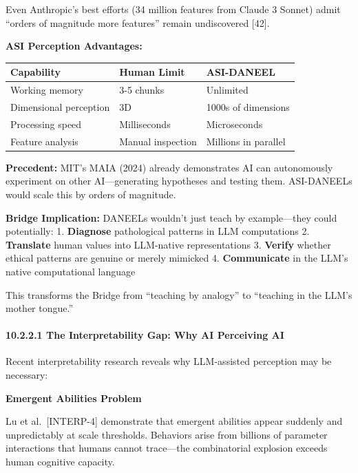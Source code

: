 \documentclass[
  11pt,
]{article}
\newcounter{none} %
\begin{document}
Even Anthropic's best efforts (34 million features from Claude 3 Sonnet)
admit ``orders of magnitude more features'' remain undiscovered
{[}42{]}.

\textbf{ASI Perception Advantages:}

{\def\LTcaptype{none} %
\begin{longtable}[]{@{}lll@{}}
\toprule\noalign{}
Capability & Human Limit & ASI-DANEEL \\
\midrule\noalign{}
\endhead
\bottomrule\noalign{}
\endlastfoot
Working memory & 3-5 chunks & Unlimited \\
Dimensional perception & 3D & 1000s of dimensions \\
Processing speed & Milliseconds & Microseconds \\
Feature analysis & Manual inspection & Millions in parallel \\
\end{longtable}
}

\textbf{Precedent:} MIT's MAIA (2024) already demonstrates AI can
autonomously experiment on other AI---generating hypotheses and testing
them. ASI-DANEELs would scale this by orders of magnitude.

\textbf{Bridge Implication:} DANEELs wouldn't just teach by
example---they could potentially: 1. \textbf{Diagnose} pathological
patterns in LLM computations 2. \textbf{Translate} human values into
LLM-native representations 3. \textbf{Verify} whether ethical patterns
are genuine or merely mimicked 4. \textbf{Communicate} in the LLM's
native computational language

This transforms the Bridge from ``teaching by analogy'' to ``teaching in
the LLM's mother tongue.''

\paragraph{10.2.2.1 The Interpretability Gap: Why AI Perceiving
AI}\label{the-interpretability-gap-why-ai-perceiving-ai}

Recent interpretability research reveals why LLM-assisted perception may
be necessary:

\textbf{Emergent Abilities Problem}

Lu et al.~{[}INTERP-4{]} demonstrate that emergent abilities appear
suddenly and unpredictably at scale thresholds. Behaviors arise from
billions of parameter interactions that humans cannot trace---the
combinatorial explosion exceeds human cognitive capacity.
\end{document}
